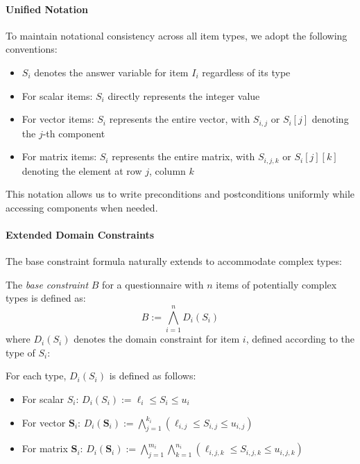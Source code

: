 \paragraph{Unified Notation}

To maintain notational consistency across all item types, we adopt the following conventions:

\begin{itemize}
    \item $S_i$ denotes the answer variable for item $I_i$ regardless of its type
    \item For scalar items: $S_i$ directly represents the integer value
    \item For vector items: $S_i$ represents the entire vector, with $S_{i,j}$ or $S_i[j]$ denoting the $j$-th component
    \item For matrix items: $S_i$ represents the entire matrix, with $S_{i,j,k}$ or $S_i[j][k]$ denoting the element at row $j$, column $k$
\end{itemize}

This notation allows us to write preconditions and postconditions uniformly while accessing components when needed.

\paragraph{Extended Domain Constraints}

The base constraint formula naturally extends to accommodate complex types:

\begin{definition}
\label{def:base-constraint-complex}
The \emph{base constraint} $B$ for a questionnaire with $n$ items of potentially complex types is defined as:
\[
B := \bigwedge_{i=1}^{n} D_i(S_i)
\]
where $D_i(S_i)$ denotes the domain constraint for item $i$, defined according to the type of $S_i$:
\end{definition}

For each type, $D_i(S_i)$ is defined as follows:

\begin{itemize}
    \item For scalar $S_i$: $D_i(S_i) := \ell_i \leq S_i \leq u_i$
    \item For vector $\mathbf{S}_i$: $D_i(\mathbf{S}_i) := \bigwedge_{j=1}^{k_i} (\ell_{i,j} \leq S_{i,j} \leq u_{i,j})$
    \item For matrix $\mathbf{S}_i$: $D_i(\mathbf{S}_i) := \bigwedge_{j=1}^{m_i} \bigwedge_{k=1}^{n_i} (\ell_{i,j,k} \leq S_{i,j,k} \leq u_{i,j,k})$
\end{itemize}

